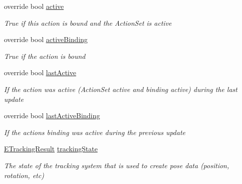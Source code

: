 \begin{DoxyCompactItemize}
override bool \mbox{\hyperlink{class_valve_1_1_v_r_1_1_steam_v_r___action___pose___source_a92f914b4e3978b25338835f695a437e0}{active}}
\begin{DoxyCompactList}\small\item\em True if this action is bound and the Action\+Set is active \end{DoxyCompactList}\item 
override bool \mbox{\hyperlink{class_valve_1_1_v_r_1_1_steam_v_r___action___pose___source_a4588c87bed6643e492f17d8b0cbb310e}{active\+Binding}}
\begin{DoxyCompactList}\small\item\em True if the action is bound \end{DoxyCompactList}\item 
override bool \mbox{\hyperlink{class_valve_1_1_v_r_1_1_steam_v_r___action___pose___source_a120e4ed1bbaf248457fcaade042ce96d}{last\+Active}}
\begin{DoxyCompactList}\small\item\em If the action was active (Action\+Set active and binding active) during the last update \end{DoxyCompactList}\item 
override bool \mbox{\hyperlink{class_valve_1_1_v_r_1_1_steam_v_r___action___pose___source_a3b73993862a63aafd1fceba531af6300}{last\+Active\+Binding}}
\begin{DoxyCompactList}\small\item\em If the action\textquotesingle{}s binding was active during the previous update \end{DoxyCompactList}\item 
\mbox{\hyperlink{namespace_valve_1_1_v_r_abe6feab98f33191b7c27b4292012e90a}{E\+Tracking\+Result}} \mbox{\hyperlink{class_valve_1_1_v_r_1_1_steam_v_r___action___pose___source_ac34e76b909d5bae5549ef1254aee7334}{tracking\+State}}
\begin{DoxyCompactList}\small\item\em The state of the tracking system that is used to create pose data (position, rotation, etc) \end{DoxyCompactList}\item 

\end{DoxyCompactItemize}
